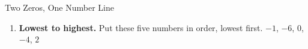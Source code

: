 \documentclass[10pt]{article}
\begin{document}
\begin{notesbox}{Two Zeros, One Number Line}
\begin{enumerate}[leftmargin=1.6em, itemsep=4pt, topsep=4pt]
\item \textbf{Lowest to highest.} Put these five numbers in order, lowest first.
\quad $-1$, \quad $-6$, \quad $0$, \quad $-4$, \quad $2$

\\

\end{enumerate}
\end{notesbox}
\end{document}
